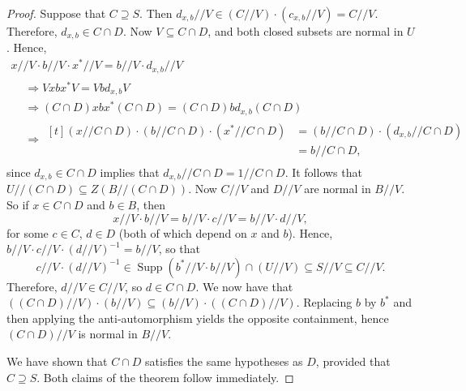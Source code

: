 \documentclass[ALCO,ThmDefs,Unicode,epreuves]{cedram}
\DeclareMathOperator{\Supp}{Supp}
\begin{document}
\begin{proof}
Suppose that $C \supseteq S$. Then $d_{x,b}//V \in (C//V)\cdot
(c_{x,b}//V) 
= C//V$. Therefore, $d_{x,b} \in C\cap D$. Now $V \subseteq C\cap D$,
and both closed subsets are normal in $U$. Hence,
\begin{multline*}
x//V\cdot b//V\cdot x^*//V = b//V\cdot d_{x,b}//V\\ 
\begin{aligned}
&\Rightarrow 
Vxbx^*V = Vbd_{x,b}V
\\
 &\Rightarrow (C\cap D)xbx^*(C\cap D) = (C\cap
D)bd_{x,b}(C\cap D)
\\
& \Rightarrow\begin{aligned}[t](x//C\cap D)\cdot (b//C\cap D)\cdot
(x^*//C\cap D) &= (b//C\cap D)\cdot (d_{x,b}//C\cap D)\\
 &= b//C\cap D,
 \end{aligned}
\end{aligned}
\end{multline*}
since $d_{x,b} \in C\cap D$ implies that $d_{x,b}//C\cap D = 1//C\cap
D$. It follows that $U//(C\cap D) \subseteq Z(B//(C\cap D))$. 
Now 
 $C//V$ and $D//V$ are normal in $B//V$. 
 So if $x \in C\cap
D$ and $b \in B$, then 
\[
x//V\cdot b//V = b//V\cdot c//V = b//V\cdot d//V,
\]
for some $c \in C$, $d \in D$ (both of which depend on $x$ and $b$).
Hence, $b//V\cdot c//V\cdot (d//V)^{-1} = b//V$, so that 
\[
 c//V\cdot (d//V)^{-1} \in \Supp (b^*//V\cdot b//V)\cap (U//V) \subseteq S//V
\subseteq C//V.
\]
Therefore, $d//V \in C//V$, so $d \in C\cap D$. We now have that
$((C\cap D)//V)\cdot (b//V) \subseteq (b//V)\cdot ((C\cap D)//V)$. Replacing
$b$ by $b^*$ and then applying the anti-automorphism yields the opposite
containment, hence $(C\cap D)//V$ is normal in $B//V$. 

We have shown
that $C\cap D$ satisfies the same hypotheses as $D$, provided that $C
\supseteq S$. Both claims of the theorem follow immediately. 
\end{proof}



\end{document}
